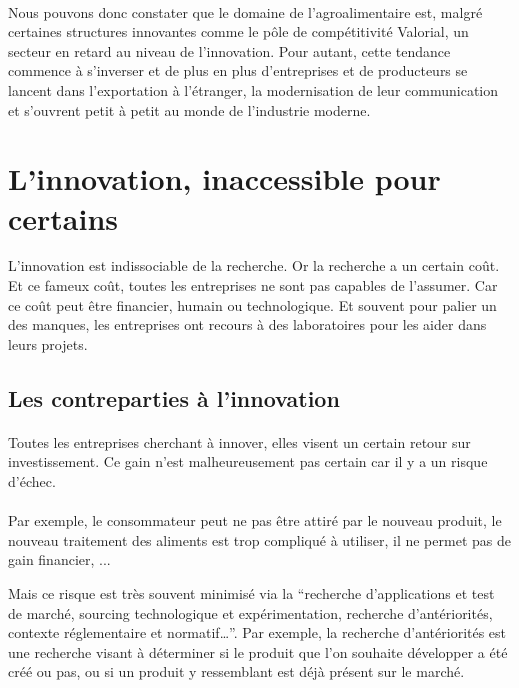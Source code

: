 \documentclass[a4paper,12pt]{report}
\begin{document}
			\paragraph{}Nous pouvons donc constater que le domaine de l’agroalimentaire est, malgré certaines structures innovantes comme le pôle de compétitivité Valorial, un secteur en retard au niveau de l’innovation. Pour autant, cette tendance commence à s’inverser et de plus en plus d’entreprises et de producteurs se lancent dans l’exportation à l’étranger, la modernisation de leur communication et s’ouvrent petit à petit au monde de l’industrie moderne.
			
	\section{L'innovation, inaccessible pour certains}
		L’innovation est indissociable de la recherche. Or la recherche a un certain coût. Et ce fameux coût, toutes les entreprises ne sont pas capables de l’assumer. Car ce coût peut être financier, humain ou technologique. Et souvent pour palier un des manques, les entreprises ont recours à des laboratoires pour les aider dans leurs projets.
		
		\subsection{Les contreparties à l'innovation}
		
		\paragraph{}Toutes les entreprises cherchant à innover, elles visent un certain retour sur investissement. Ce gain n’est malheureusement pas certain car il y a un risque d'échec.

		\paragraph{}Par exemple, le consommateur peut ne pas être attiré par le nouveau produit, le nouveau traitement des aliments est trop compliqué à utiliser, il ne permet pas de gain financier, ... 
		
		Mais ce risque est très souvent minimisé via la “recherche d’applications et test de marché, sourcing technologique et expérimentation, recherche d’antériorités, contexte réglementaire et  normatif…”\cite{GlobalVision}. Par exemple, la recherche d'antériorités est une recherche visant à déterminer si le produit que l'on souhaite développer a été créé ou pas, ou si un produit y ressemblant est déjà présent sur le marché.
		
\end{document}
